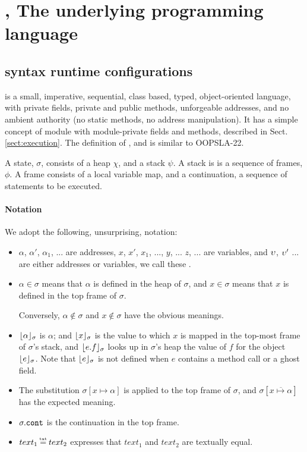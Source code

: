 \section{\LangOO, The underlying programming language }  

\subsection{\LangOO syntax runtime configurations}
\label{sub:Loo} 
 \LangOO  is a {small}, imperative, sequential,  class based, typed, object-oriented language,  
 with private fields, private and public methods, unforgeable addresses, and no ambient authority (no static methods, no address manipulation).
 It has a simple concept of module with module-private fields and methods, described in Sect. \ref{sect:execution}.
 The definition of , and is  similar to   OOPSLA-22.

A \LangOO state, $\sigma$,  consists of a  heap $\chi$, and a   stack $\psi$. A stack is is a sequence of frames, $\phi$.
A frame consists of a local variable map, and a continuation, \ie a sequence of statements to be executed.


 
\paragraph{Notation} We adopt the following, unsurprising, notation:
\begin{itemize}
\item
$\alpha$, $\alpha'$, $\alpha_1$, ... are addresses,   $x$, $x'$, $x_1$, ..., $y$, ... $z$, ... are variables, and $\upsilon$, $\upsilon'$ ... are either addresses or variables, we call these \emph{\atoms}.
\item
$\alpha \in \sigma$ means that $\alpha$ is defined in the heap of $\sigma$, and $x\in \sigma$ means that $x$ is defined in the top frame of $\sigma$.

Conversely,  $\alpha\notin\sigma$ and $x\notin\sigma$ %
 have the obvious meanings.
\item
$\lfloor \alpha \rfloor_{\sigma}$  is $\alpha$; and $\lfloor x \rfloor_{\sigma}$  is the value to which  $x$  is mapped in the top-most frame of $\sigma$'s stack, 
and $\lfloor e.f \rfloor_{\sigma}$ looks up in $\sigma$'s heap the value of $f$ for the object  $\lfloor e \rfloor_{\sigma}$.
Note that $\lfloor e \rfloor_{\sigma}$ is not defined when $e$ contains a method call or a ghost field.
\item The substitution  $\sigma[x \mapsto \alpha]$ is applied to the top frame of $\sigma$, and $\sigma[\overline{x \mapsto \alpha}]$ %
has the expected meaning.
\item
$\sigma.{\texttt{cont}}$ is the continuation in the top frame.
\item
$text_1 \txteq text_2$ expresses that $text_1$ and $text_2$ are textually equal.
\end{itemize}


